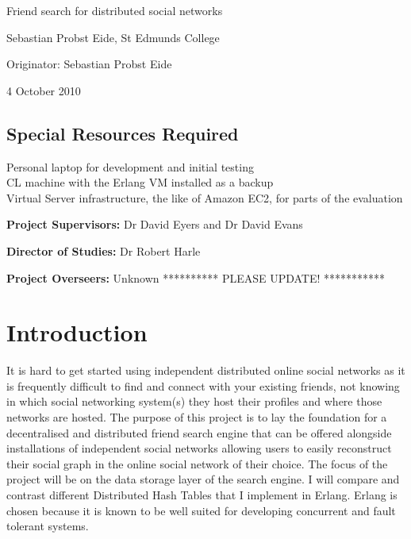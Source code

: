 

\vfil

\centerline{\Large Friend search for distributed social networks }
\vspace{0.4in}
\centerline{\large Sebastian Probst Eide, St Edmunds College }
\vspace{0.3in}
\centerline{\large Originator: Sebastian Probst Eide}
\vspace{0.3in}
\centerline{\large 4 October 2010}

\vfil

\subsection*{Special Resources Required}
Personal laptop for development and initial testing \\
CL machine with the Erlang VM installed as a backup \\
Virtual Server infrastructure, the like of Amazon EC2, for parts of the evaluation \\
\vspace{0.2in}

\noindent
{\bf Project Supervisors:} Dr David Eyers and Dr David Evans
\vspace{0.2in}

\noindent
{\bf Director of Studies:} Dr Robert Harle
\vspace{0.2in}
\noindent
 
\noindent
{\bf Project Overseers:} Unknown ********** PLEASE UPDATE! ***********

\vfil
\pagebreak


\section*{Introduction}

It is hard to get started using independent distributed online social networks as it is frequently difficult to find and connect with your existing friends, not knowing in which social networking system(s) they host their profiles and where those networks are hosted. The purpose of this project is to lay the foundation for a decentralised and distributed friend search engine that can be offered alongside installations of independent social networks allowing users to easily reconstruct their social graph in the online social network of their choice. The focus of the project will be on the data storage layer of the search engine. I will compare and contrast different Distributed Hash Tables that I implement in Erlang. Erlang is chosen because it is known to be well suited for developing concurrent and fault tolerant systems.

